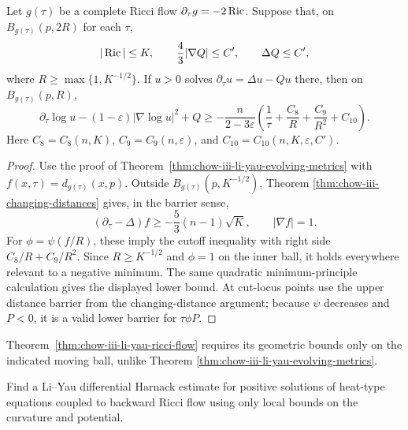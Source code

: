 \begin{theorem}
\label{thm:chow-iii-li-yau-ricci-flow}
Let \(g(\tau)\) be a complete Ricci flow
\(\partial_\tau g=-2\operatorname{Ric}\).  Suppose that, on
\(B_{g(\tau)}(p,2R)\) for each \(\tau\),
\[
 |\operatorname{Ric}|\leq K,\qquad \frac43|\nabla Q|\leq C',
 \qquad\Delta Q\leq C',
\]
where \(R\geq\max\{1,K^{-1/2}\}\).  If \(u>0\) solves
\(\partial_\tau u=\Delta u-Qu\) there, then on
\(B_{g(\tau)}(p,R)\),
\[
 \partial_\tau\log u-(1-\varepsilon)|\nabla\log u|^2+Q
 \geq-\frac{n}{2-3\varepsilon}
 \left(\frac1\tau+\frac{C_8}{R}+\frac{C_9}{R^2}+C_{10}\right).
\]
Here \(C_8=C_8(n,K)\), \(C_9=C_9(n,\varepsilon)\), and
\(C_{10}=C_{10}(n,K,\varepsilon,C')\).
\end{theorem}
\begin{proof}
Use the proof of Theorem~\ref{thm:chow-iii-li-yau-evolving-metrics} with
\(f(x,\tau)=d_{g(\tau)}(x,p)\).  Outside
\(B_{g(\tau)}(p,K^{-1/2})\), Theorem
\ref{thm:chow-iii-changing-distances} gives, in the barrier sense,
\[
 (\partial_\tau-\Delta)f\geq-\frac53(n-1)\sqrt K,
 \qquad |\nabla f|=1.
\]
For \(\phi=\psi(f/R)\), these imply the cutoff inequality with right side
\(C_8/R+C_9/R^2\).  Since \(R\geq K^{-1/2}\) and \(\phi=1\) on the inner
ball, it holds everywhere relevant to a negative minimum.  The same
quadratic minimum-principle calculation gives the displayed lower bound.
At cut-locus points use the upper distance barrier from the changing-distance
argument; because \(\psi\) decreases and \(P<0\), it is a valid lower barrier
for \(\tau\phi P\).
\end{proof}

\begin{remark}
\label{rem:chow-iii-li-yau-locality-ricci-flow}
Theorem~\ref{thm:chow-iii-li-yau-ricci-flow} requires its geometric bounds
only on the indicated moving ball, unlike Theorem
\ref{thm:chow-iii-li-yau-evolving-metrics}.
\end{remark}

\begin{example}
\label{ex:chow-iii-local-li-yau-backward-ricci-flow}
Find a Li--Yau differential Harnack estimate for positive solutions of
heat-type equations coupled to backward Ricci flow using only local bounds on
the curvature and potential.
\end{example}

